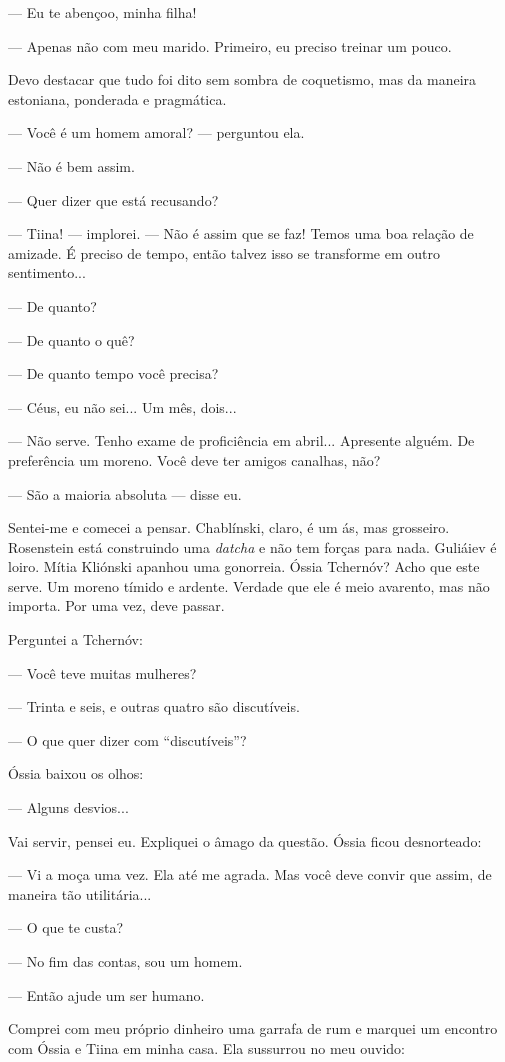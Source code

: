 --- Eu te abençoo, minha filha!

--- Apenas não com meu marido. Primeiro, eu preciso treinar um pouco.

Devo destacar que tudo foi dito sem sombra de coquetismo, mas da maneira
estoniana, ponderada e pragmática.

--- Você é um homem amoral? --- perguntou ela.

--- Não é bem assim.

--- Quer dizer que está recusando?

--- Tiina! --- implorei. --- Não é assim que se faz! Temos uma boa
relação de amizade. É preciso de tempo, então talvez isso se transforme
em outro sentimento...

--- De quanto?

--- De quanto o quê?

--- De quanto tempo você precisa?

--- Céus, eu não sei... Um mês, dois...

--- Não serve. Tenho exame de proficiência em abril... Apresente alguém.
De preferência um moreno. Você deve ter amigos canalhas, não?

--- São a maioria absoluta --- disse eu.

Sentei-me e comecei a pensar. Chablínski, claro, é um ás, mas grosseiro.
Rosenstein está construindo uma \emph{datcha} e não tem forças para
nada. Guliáiev é loiro. Mítia Kliónski apanhou uma gonorreia. Óssia
Tchernóv? Acho que este serve. Um moreno tímido e ardente. Verdade que
ele é meio avarento, mas não importa. Por uma vez, deve passar.

Perguntei a Tchernóv:

--- Você teve muitas mulheres?

--- Trinta e seis, e outras quatro são discutíveis.

--- O que quer dizer com ``discutíveis''?

Óssia baixou os olhos:

--- Alguns desvios...

Vai servir, pensei eu. Expliquei o âmago da questão. Óssia ficou
desnorteado:

--- Vi a moça uma vez. Ela até me agrada. Mas você deve convir que
assim, de maneira tão utilitária...

--- O que te custa?

--- No fim das contas, sou um homem.

--- Então ajude um ser humano.

Comprei com meu próprio dinheiro uma garrafa de rum e marquei um
encontro com Óssia e Tiina em minha casa. Ela sussurrou no meu ouvido:

